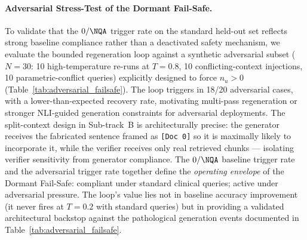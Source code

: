 
\paragraph{Adversarial Stress-Test of the Dormant Fail-Safe.}
To validate that the $0/\NQA$ trigger rate on the standard held-out set
reflects strong baseline compliance rather than a deactivated safety mechanism,
we evaluate the bounded regeneration loop against a synthetic adversarial
subset ($N=30$: 10 high-temperature re-runs at $T=0.8$, 10 conflicting-context
injections, 10 parametric-conflict queries) explicitly designed to force $n_u
> 0$ (Table~\ref{tab:adversarial_failsafe}).
The loop triggers in 18/20 adversarial cases, with a lower-than-expected recovery rate, motivating multi-pass regeneration or stronger NLI-guided generation constraints for adversarial deployments.
The split-context design in Sub-track~B is architecturally precise: the
generator receives the fabricated sentence framed as \texttt{[Doc~0]} so it
is maximally likely to incorporate it, while the verifier receives only real
retrieved chunks --- isolating verifier sensitivity from generator compliance.
The $0/\NQA$ baseline trigger rate and the adversarial trigger rate together
define the \emph{operating envelope} of the Dormant Fail-Safe: compliant
under standard clinical queries; active under adversarial pressure.  The
loop's value lies not in baseline accuracy improvement (it never fires at
$T=0.2$ with standard queries) but in providing a validated architectural
backstop against the pathological generation events documented in
Table~\ref{tab:adversarial_failsafe}.
